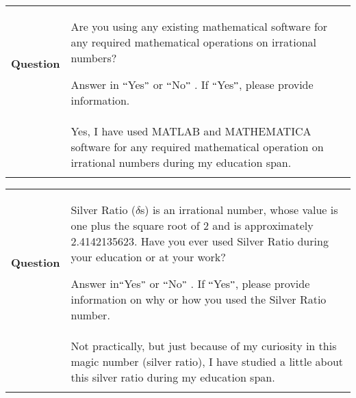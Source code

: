 \documentclass[12pt, letterpaper]{article}
\begin{document}
\begin{table}[H]
 			\centering
\begin{tabular}{p{0.7in}p{5.39in}}
\hline

\multicolumn{1}{|p{0.7in}}{\textbf{Question}} & 
\multicolumn{1}{|p{5.39in}|}{Are you using any existing mathematical software for any required mathematical operations on irrational numbers?  \par Answer in $``$Yes$"$  or $``$No$"$ . If $``$Yes$"$, please provide information. \par } \\
\hhline{--}

\multicolumn{1}{|p{0.7in}}{\textbf{Response}} & 
\multicolumn{1}{|p{5.39in}|}{Yes, I have used MATLAB and MATHEMATICA software for any required mathematical operation on irrational numbers during my education span.} \\
\hhline{--}

\end{tabular}
 \end{table}



\begin{table}[H]
 			\centering
\begin{tabular}{p{0.7in}p{5.39in}}
\hline

\multicolumn{1}{|p{0.7in}}{\textbf{Question}} & 
\multicolumn{1}{|p{5.39in}|}{Silver Ratio ($ \delta $s) is an irrational number, whose value is one plus the square root of 2 and is approximately 2.4142135623. Have you ever used Silver Ratio during your education or at your work?  \par Answer in$``$Yes$"$  or $``$No$"$ . If $``$Yes$"$, please provide information on why or how you used the Silver Ratio number. \par } \\
\hhline{--}

\multicolumn{1}{|p{0.7in}}{\textbf{Response}} & 
\multicolumn{1}{|p{5.39in}|}{Not practically, but just because of my curiosity in this magic number (silver ratio), I have studied a little about this silver ratio during my education span.} \\
\hhline{--}

\end{tabular}
 \end{table}
\end{document}
